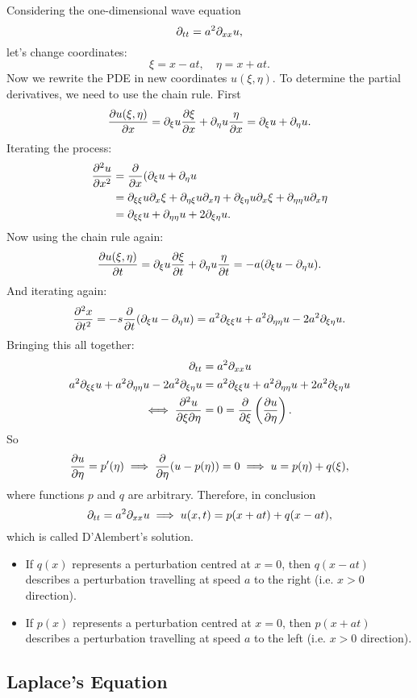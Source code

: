 Considering the one-dimensional wave equation
\[
	\partial_{tt} = a^2\partial_{xx}u,
\]
let's change coordinates:
\[
	\xi = x - at, \quad \eta = x + at.
\]
Now we rewrite the PDE in new coordinates $u(\xi, \eta)$. To determine the partial derivatives, we need to use the chain rule. First
\[
	\frac{\partial u(\xi, \eta)}{\partial x} = \partial_{\xi}u\frac{\partial\xi}{\partial x} + \partial_{\eta}u\frac{\eta}{\partial x} = \partial_{\xi}u + \partial_{\eta}u.
\]
Iterating the process:
\begin{align*}
	\frac{\partial^2u}{\partial x^2} &= \frac{\partial}{\partial x}(\partial_{\xi}u + \partial_{\eta}u \\
	&= \partial_{\xi\xi}u \partial_x\xi + \partial_{\eta\xi}u \partial_x\eta + \partial_{\xi\eta}u \partial_x\xi + \partial_{\eta\eta}u \partial_x\eta \\
	&= \partial_{\xi\xi}u + \partial_{\eta\eta}u + 2\partial_{\xi\eta}u.
\end{align*}
Now using the chain rule again:
\[
	\frac{\partial u(\xi, \eta)}{\partial t} = \partial_{\xi}u\frac{\partial\xi}{\partial t} + \partial_{\eta}u\frac{\eta}{\partial t} = -a(\partial_{\xi}u - \partial_{\eta}u).
\]
And iterating again:
\[
	\frac{\partial^2x}{\partial t^2} = -s\frac{\partial}{\partial t} (\partial_{\xi}u - \partial_{\eta}u) = a^2\partial_{\xi\xi}u + a^2\partial_{\eta\eta}u - 2a^2\partial_{\xi\eta}u.
\]
Bringing this all together:
\begin{align*}
	\partial_{tt} &= a^2\partial_{xx}u \\
	a^2\partial_{\xi\xi}u + a^2\partial_{\eta\eta}u - 2a^2\partial_{\xi\eta}u &= a^2\partial_{\xi\xi}u + a^2\partial_{\eta\eta}u + 2a^2\partial_{\xi\eta}u \\
	\iff \frac{\partial^2u}{\partial\xi\partial\eta} &= 0 = \frac{\partial}{\partial\xi}\left(\frac{\partial u}{\partial\eta}\right).
\end{align*}
So
\[
	\frac{\partial u}{\partial\eta} = p'(\eta) \implies \frac{\partial}{\partial\eta}(u - p(\eta)) = 0 \implies u = p(\eta) + q(\xi),
\]
where functions $p$ and $q$ are arbitrary. Therefore, in conclusion
\[
	\partial_{tt} = a^2\partial_{xx}u \implies u(x,t) = p(x+at) + q(x-at),
\]
which is called D'Alembert's solution.
\begin{itemize}
	\item If $q(x)$ represents a perturbation centred at $x=0$, then $q(x-at)$ describes a perturbation travelling at speed $a$ to the right (i.e. $x>0$ direction).
	\item If $p(x)$ represents a perturbation centred at $x=0$, then $p(x+at)$ describes a perturbation travelling at speed $a$ to the left (i.e. $x>0$ direction).
\end{itemize}


\subsection{Laplace's Equation}

